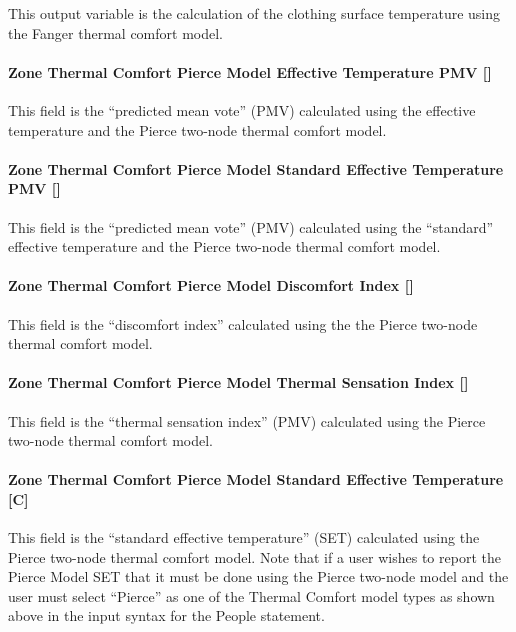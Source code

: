 This output variable is the calculation of the clothing surface temperature using the Fanger thermal comfort model.

\paragraph{Zone Thermal Comfort Pierce Model Effective Temperature PMV {[]}}\label{zone-thermal-comfort-pierce-model-effective-temperature-pmv}

This field is the ``predicted mean vote'' (PMV) calculated using the effective temperature and the Pierce two-node thermal comfort model.

\paragraph{Zone Thermal Comfort Pierce Model Standard Effective Temperature PMV {[]}}\label{zone-thermal-comfort-pierce-model-standard-effective-temperature-pmv}

This field is the ``predicted mean vote'' (PMV) calculated using the ``standard'' effective temperature and the Pierce two-node thermal comfort model.

\paragraph{Zone Thermal Comfort Pierce Model Discomfort Index {[]}}\label{zone-thermal-comfort-pierce-model-discomfort-index}

This field is the ``discomfort index'' calculated using the the Pierce two-node thermal comfort model.

\paragraph{Zone Thermal Comfort Pierce Model Thermal Sensation Index {[]}}\label{zone-thermal-comfort-pierce-model-thermal-sensation-index}

This field is the ``thermal sensation index'' (PMV) calculated using the Pierce two-node thermal comfort model.

\paragraph{Zone Thermal Comfort Pierce Model Standard Effective Temperature {[C]}}\label{zone-thermal-comfort-pierce-model-standard-effective-temperature}

This field is the ``standard effective temperature'' (SET) calculated using the Pierce two-node thermal comfort model.  Note that if a user wishes to report the Pierce Model SET that it must be done using the Pierce two-node model and the user must select ``Pierce'' as one of the Thermal Comfort model types as shown above in the input syntax for the People statement.

